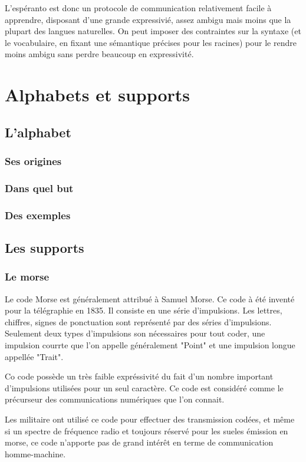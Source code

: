 \documentclass[french,a4paper]{article}
\begin{document}
L'espéranto est donc un protocole de communication relativement facile
à apprendre, disposant d'une grande expressivié, assez ambigu mais
moins que la plupart des langues naturelles. On peut imposer des
contraintes sur la syntaxe (et le vocabulaire, en fixant une
sémantique précises pour les racines) pour le rendre moins ambigu sans
perdre beaucoup en expressivité.

\section{Alphabets et supports}
\subsection{L'alphabet}
\subsubsection{Ses origines}
\subsubsection{Dans quel but}
\subsubsection{Des exemples}

\subsection{Les supports}
\subsubsection{Le morse}
Le code Morse est généralement attribué à Samuel Morse. Ce code à été inventé pour la télégraphie en 1835.
Il consiste en une série d'impulsions. Les lettres, chiffres, signes de ponctuation sont représenté par des séries d'impulsions.
Seulement deux types d'impulsions son nécessaires pour tout coder, une impulsion courrte que l'on appelle généralement
"Point" et une impulsion longue appellée "Trait".

Co code possède un très faible expréssivité du fait d'un nombre important d'impulsions utilisées pour un seul caractère.
Ce code est considéré comme le précurseur des communications numériques que l'on connait.

Les militaire ont utilisé ce code pour effectuer des transmission codées, et même si un spectre de fréquence radio et toujours 
réservé pour les sueles émission en morse, ce code n'apporte pas de grand intérêt en terme de communication homme-machine.
\end{document}
